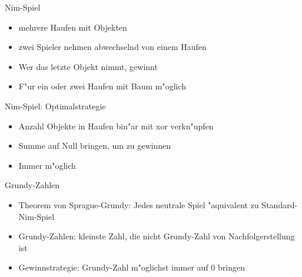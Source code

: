 \documentclass[18pt]{beamer}
\begin{document}
\begin{frame}{Nim-Spiel}
\begin{itemize}
\item mehrere Haufen mit Objekten
\pause
\item zwei Spieler nehmen abwechselnd von einem Haufen
\pause
\item Wer das letzte Objekt nimmt, gewinnt
\pause
\item F"ur ein oder zwei Haufen mit Baum m"oglich 
\end{itemize}
\end{frame}

\begin{frame}{Nim-Spiel: Optimalstrategie}
\begin{itemize}
\item Anzahl Objekte in Haufen bin"ar mit xor verkn"upfen
\pause
\item Summe auf Null bringen, um zu gewinnen
\pause
\item Immer m"oglich
\end{itemize}
\end{frame}

\begin{frame}{Grundy-Zahlen}
\begin{itemize}
\item Theorem von Sprague-Grundy: Jedes neutrale Spiel "aquivalent zu Standard-Nim-Spiel
\pause
\item Grundy-Zahlen: kleinste Zahl, die nicht Grundy-Zahl von Nachfolgerstellung ist
\pause
\item Gewinnstrategie: Grundy-Zahl m"oglichst immer auf 0 bringen
\end{itemize}
\end{frame}
\end{document}
